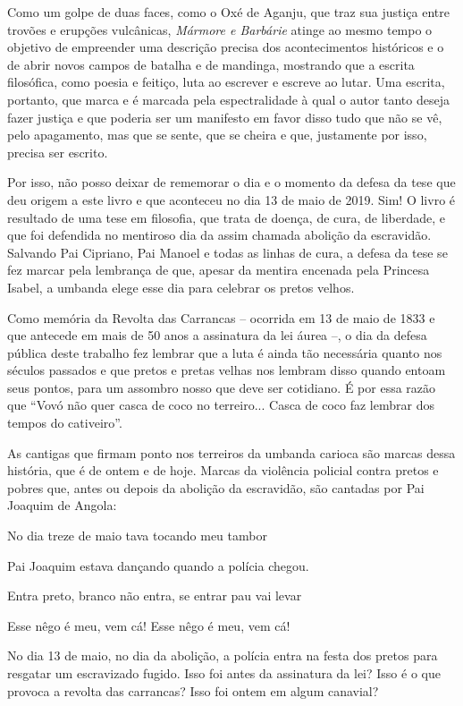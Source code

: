 Como um golpe de duas faces, como o Oxé de Aganju, que traz sua justiça
entre trovões e erupções vulcânicas, \emph{Mármore e Barbárie} atinge ao
mesmo tempo o objetivo de empreender uma descrição precisa dos
acontecimentos históricos e o de abrir novos campos de batalha e de
mandinga, mostrando que a escrita filosófica, como poesia e feitiço,
luta ao escrever e escreve ao lutar. Uma escrita, portanto, que marca e
é marcada pela espectralidade à qual o autor tanto deseja fazer justiça
e que poderia ser um manifesto em favor disso tudo que não se vê, pelo
apagamento, mas que se sente, que se cheira e que, justamente por isso,
precisa ser escrito.

Por isso, não posso deixar de rememorar o dia e o momento da defesa da
tese que deu origem a este livro e que aconteceu no dia 13 de maio de
2019. Sim! O livro é resultado de uma tese em filosofia, que trata de
doença, de cura, de liberdade, e que foi defendida no mentiroso dia da
assim chamada abolição da escravidão. Salvando Pai Cipriano, Pai Manoel
e todas as linhas de cura, a defesa da tese se fez marcar pela lembrança
de que, apesar da mentira encenada pela Princesa Isabel, a umbanda elege
esse dia para celebrar os pretos velhos.

Como memória da Revolta das Carrancas -- ocorrida em 13 de maio de 1833
e que antecede em mais de 50 anos a assinatura da lei áurea --, o dia da
defesa pública deste trabalho fez lembrar que a luta é ainda tão
necessária quanto nos séculos passados e que pretos e pretas velhas nos
lembram disso quando entoam seus pontos, para um assombro nosso que deve
ser cotidiano. É por essa razão que ``Vovó não quer casca de coco no
terreiro... Casca de coco faz lembrar dos tempos do cativeiro''.

As cantigas que firmam ponto nos terreiros da umbanda carioca são marcas
dessa história, que é de ontem e de hoje. Marcas da violência policial
contra pretos e pobres que, antes ou depois da abolição da escravidão,
são cantadas por Pai Joaquim de Angola:

No dia treze de maio tava tocando meu tambor

Pai Joaquim estava dançando quando a polícia chegou.

Entra preto, branco não entra, se entrar pau vai levar

Esse nêgo é meu, vem cá! Esse nêgo é meu, vem cá!

No dia 13 de maio, no dia da abolição, a polícia entra na festa dos
pretos para resgatar um escravizado fugido. Isso foi antes da assinatura
da lei? Isso é o que provoca a revolta das carrancas? Isso foi ontem em
algum canavial?

